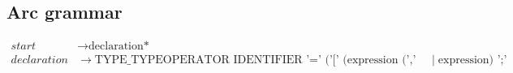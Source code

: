 \subsection{Arc grammar}\label{sec:arcgrammar}

\begin{align*}
    start       & \to \text{declaration*}                                                                                           \\
    declaration & \to \text{TYPE\_TYPEOPERATOR IDENTIFIER '=' ('[' (expression (',' expression)*)? ']'} \mid \text{expression) ';'} \\
\end{align*}
